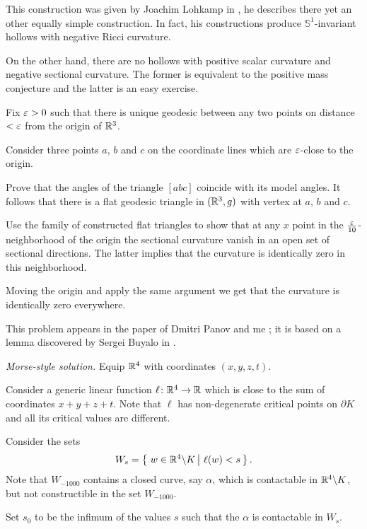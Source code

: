 This construction was given by Joachim Lohkamp in \cite{lohkamp},
he describes there yet an other equally simple construction.
In fact,
his constructions produce 
$\mathbb{S}^1$-invariant hollows 
with negative Ricci curvature.

On the other hand,
there are no hollows with 
positive scalar curvature and negative sectional curvature.
The former is equivalent to the positive mass conjecture \cite[see][and the references therein]{witten}
and the latter is an easy exercise.

Fix $\varepsilon>0$ such that there is unique geodesic between any two points on distance $<\varepsilon$ from the origin of $\mathbb{R}^3$.

Consider three points $a$, $b$ and $c$ 
on the coordinate lines which are $\varepsilon$-close 
to the origin.

Prove that the angles of the triangle $[abc]$
coincide with its model angles.
It follows that there is a flat geodesic triangle in $(\mathbb{R}^3,g)$ with vertex at $a$, $b$ and $c$.

Use the family of constructed flat triangles 
to show that at any $x$ point in the $\tfrac{\varepsilon}{10}$-neighborhood of the origin
the sectional curvature 
vanish in an open set of sectional directions.
The latter implies that the curvature is identically zero 
in this neighborhood.

Moving the origin and apply the same argument we get that the curvature is identically zero everywhere.
\qeds

This problem appears in the paper of Dmitri Panov and me \cite[see][]{panov-petrunin}; 
it is based on a lemma discovered by Sergei Buyalo in \cite[Lemma 5.8 in][]{buyalo}.

\textit{Morse-style solution.}
Equip $\mathbb{R}^4$ with coordinates $(x,y,z,t)$.

Consider a generic linear function $\ell\colon\mathbb{R}^4\to\mathbb{R}$
which is close to the sum of coordinates $x+y+z+t$.
Note that $\ell$
has non-degenerate critical points on $\partial K$ and all its critical values are different.

Consider the sets 
$$W_s=\set{w\in \RR^4\backslash K}{\ell(w)<s}.$$
Note that $W_{-1000}$ contains a closed curve, say $\alpha$, 
which is contactable in $\mathbb{R}^4\backslash K$, 
but not constructible in the set $W_{-1000}$.

Set $s_0$ to be the infimum of the values $s$ such that
the $\alpha$ is contactable in $W_s$.

